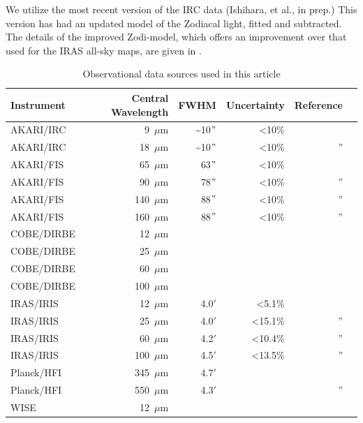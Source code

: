 \documentclass[preprint2,longabstract]{aastex}
\begin{document}
      We utilize the most recent version of the IRC data (Ishihara, et al., in prep.) This version has had an updated model of the Zodiacal light, fitted and subtracted. The details of the improved Zodi-model, which offers an improvement over that used for the IRAS all-sky maps, are given in \cite{kondo16}.
\begin{table}
\label{tab:data}
\caption{Observational data sources used in this article}
\centering
\begin{tabular}{lrrrrr}
\hline\hline
Instrument & Central Wavelength & FWHM & Uncertainty & Reference \\
\hline
AKARI/IRC & 9~$\mu$m  &  \~{}10$"$ & \textless 10\%   & \citep{ishihara10} \\
AKARI/IRC & 18~$\mu$m & \~{}10$"$  & \textless 10\%     & '' \\
AKARI/FIS & 65~$\mu$m  & 63$"$ & \textless 10\% & \citep{doi15,takita16} \\
AKARI/FIS & 90~$\mu$m  & 78$"$ & \textless 10\%   & '' \\
AKARI/FIS & 140~$\mu$m & 88$"$ & \textless 10\%   & '' \\
AKARI/FIS & 160~$\mu$m & 88$"$ & \textless 10\%   & '' \\ 
COBE/DIRBE & 12~$\mu$m & & & \\
COBE/DIRBE & 25~$\mu$m & & & \\
COBE/DIRBE & 60~$\mu$m & & & \\
COBE/DIRBE & 100~$\mu$m & & & \\
IRAS/IRIS & 12~$\mu$m   & 4.0$'$ &   \textless 5.1\%       & \citep{iris05} \\
IRAS/IRIS & 25~$\mu$m   & 4.0$'$ &    \textless 15.1\%      & ''\\
IRAS/IRIS & 60~$\mu$m   & 4.2$'$ &    \textless 10.4\%      & '' \\
IRAS/IRIS & 100~$\mu$m  & 4.5$'$ &   \textless 13.5\%       & '' \\
Planck/HFI & 345~$\mu$m & 4.7$'$ & & \citep{hfi14viii} \\
Planck/HFI & 550~$\mu$m & 4.3$'$& & '' \\
WISE & 12~$\mu$m & & & &  \\
\hline
\end{tabular}
\end{table}
\end{document}
